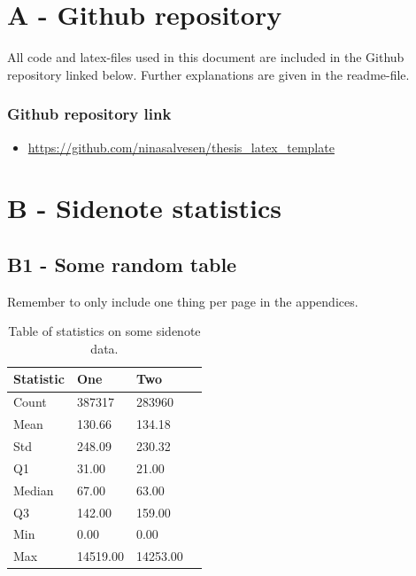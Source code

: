 

\chapter*{A - Github repository}

All code and latex-files used in this document are included in the Github repository linked below. Further explanations are given in the readme-file. 


\subsection*{Github repository link}
\begin{itemize}
    \item \url{https://github.com/ninasalvesen/thesis_latex_template}
\end{itemize}




\chapter*{B - Sidenote statistics}

\renewcommand{\thefigure}{B.\arabic{figure}}
\setcounter{figure}{0}
\renewcommand{\thetable}{B.\arabic{table}}
\setcounter{table}{0}


\section*{\large{B1 - Some random table}}
\vspace*{1cm}

Remember to only include one thing per page in the appendices.

\begin{table}[ht!]
\centering
    \begin{tabular}{ m{4cm} m{2.5cm} m{2.5cm} m{2.5cm} } 
    \toprule
    \toprule
    \textbf{Statistic} & \textbf{One} & \textbf{Two}  \\
    \midrule
    Count   & 387317    & 283960    \\[1.3ex]
    Mean    & 130.66    & 134.18    \\[1.3ex]
    Std     & 248.09    & 230.32    \\[1.3ex]
    Q1      & 31.00     & 21.00     \\[1.3ex]
    Median  & 67.00     & 63.00     \\[1.3ex]
    Q3      & 142.00    & 159.00    \\[1.3ex]
    Min     & 0.00      & 0.00      \\[1.3ex]
    Max     & 14519.00  & 14253.00  \\[1.3ex]
    \bottomrule
    \bottomrule
    \end{tabular}
\caption[Statistics on something]{Table of statistics on some sidenote data.}
\end{table}


